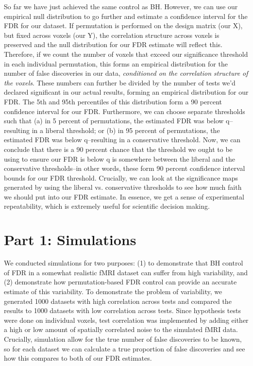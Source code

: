\documentclass[11pt,notitlepage]{article}
\begin{document}
So far we have just achieved the same control as BH. However, we can use our empirical null distribution to go further and estimate a confidence interval for the FDR for our dataset. If permutation is performed on the design matrix (our X), but fixed across voxels (our Y), the correlation structure across voxels is preserved and the null distribution for our FDR estimate will reflect this. Therefore, if we count the number of voxels that exceed our significance threshold in each individual permutation, this forms an empirical distribution for the number of false discoveries in our data, \textit{conditioned on the correlation structure of the voxels}. These numbers can further be divided by the number of tests we'd declared significant in our actual results, forming an empirical distribution for our FDR. The 5th and 95th percentiles of this distribution form a 90 percent confidence interval for our FDR. Furthermore, we can choose separate thresholds such that (a) in 5 percent of permutations, the estimated FDR was below q--resulting in a liberal threshold; or (b) in 95 percent of permutations, the estimated FDR was below q--resulting in a conservative threshold. Now, we can conclude that there is a 90 percent chance that the threshold we ought to be using to ensure our FDR is below q is somewhere between the liberal and the conservative thresholds--in other words, these form 90 percent confidence interval bounds for our FDR threshold. Crucially, we can look at the significance maps generated by using the liberal vs. conservative thresholds to see how much faith we should put into our FDR estimate. In essence, we get a sense of experimental repeatability, which is extremely useful for scientific decision making.


\newpage


\section*{Part 1: Simulations}

We conducted simulations for two purposes: (1) to demonstrate that BH control of FDR in a somewhat realistic fMRI dataset can suffer from high variability, and (2) demonstrate how permutation-based FDR control can provide an accurate estimate of this variability. To demonstrate the problem of variability, we generated 1000 datasets with high correlation across tests and compared the results to 1000 datasets with low correlation across tests. Since hypothesis tests were done on individual voxels, test correlation was implemented by adding either a high or low amount of spatially correlated noise to the simulated fMRI data. Crucially, simulation allow for the true number of false discoveries to be known, so for each dataset we can calculate a true proportion of false discoveries and see how this compares to both of our FDR estimates.
\end{document}
